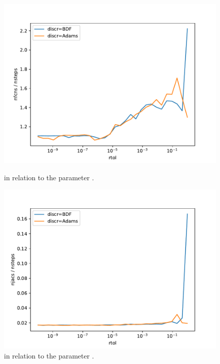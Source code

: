 \documentclass{report}
\begin{document}
\begin{figure}[h]
\centering
\begin{minipage}[b]{0.45\textwidth}
\centering
\includegraphics[width=\textwidth]{../Plots/Task4/Figure_310}
\caption{ in relation to the parameter .}
\label{pl:nfcns_nsteps2}
\end{minipage}
\hfill
\begin{minipage}[b]{0.45\textwidth}
\centering
\includegraphics[width=\textwidth]{../Plots/Task4/Figure_311}
\caption{ in relation to the parameter .}
\label{pl:njacs_nsteps2}
\end{minipage}
\end{figure}
\end{document}
